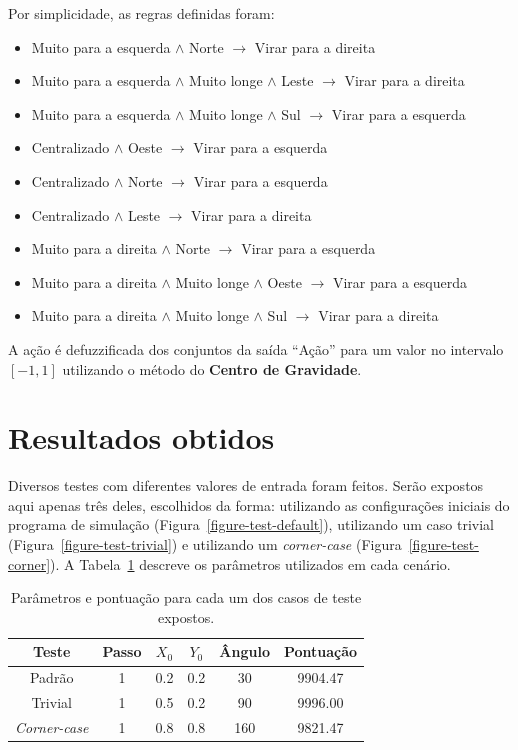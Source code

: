 \documentclass[twocolumn]{article}
\begin{document}
    Por simplicidade, as regras definidas foram:

    \begin{itemize}
        \item Muito para a esquerda $\land$ Norte $\rightarrow$ Virar para a
            direita
        \item Muito para a esquerda $\land$ Muito longe $\land$ Leste
            $\rightarrow$ Virar para a direita
        \item Muito para a esquerda $\land$ Muito longe $\land$ Sul
            $\rightarrow$ Virar para a esquerda
        \item Centralizado $\land$ Oeste $\rightarrow$ Virar para a esquerda
        \item Centralizado $\land$ Norte $\rightarrow$ Virar para a esquerda
        \item Centralizado $\land$ Leste $\rightarrow$ Virar para a direita
        \item Muito para a direita $\land$ Norte $\rightarrow$ Virar para a
            esquerda
        \item Muito para a direita $\land$ Muito longe $\land$ Oeste
            $\rightarrow$ Virar para a esquerda
        \item Muito para a direita $\land$ Muito longe $\land$ Sul
            $\rightarrow$ Virar para a direita
    \end{itemize}

    A ação é defuzzificada dos conjuntos da saída ``Ação'' para um valor no
    intervalo $[-1, 1]$ utilizando o método do \textbf{Centro de Gravidade}.

    \section{Resultados obtidos}

    Diversos testes com diferentes valores de entrada foram feitos. Serão
    expostos aqui apenas três deles, escolhidos da forma: utilizando as
    configurações iniciais do programa de simulação
    (Figura~\ref{figure-test-default}), utilizando um caso trivial
    (Figura~\ref{figure-test-trivial}) e utilizando um \textit{corner-case}
    (Figura~\ref{figure-test-corner}). A Tabela~\ref{test-params} descreve os
    parâmetros utilizados em cada cenário.

    \begin{table}[ht]
        \centering{}
        \begin{tabular}{c c c c c c}
            \toprule
            Teste   & Passo & $X_0$ & $Y_0$ & Ângulo & Pontuação \\
            \midrule
            Padrão  & 1     & 0.2   & 0.2   & 30     & 9904.47   \\
            Trivial & 1     & 0.5   & 0.2   & 90     & 9996.00   \\
            \textit{Corner-case} & 1 & 0.8 & 0.8 & 160 & 9821.47   \\
            \bottomrule
        \end{tabular}
        \caption{%
            Parâmetros e pontuação para cada um dos casos de teste
            expostos.\label{test-params}
        }
    \end{table}
\end{document}
